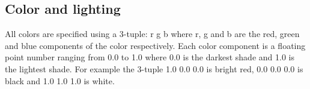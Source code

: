 \documentclass[11pt,twoside]{book}
\begin{document}




\subsection{Color and lighting}
All colors are specified using a 3-tuple: r g b
where r, g and b are the red, green and blue components of the color respectively.
Each color component is a floating point number ranging
from 0.0 to 1.0 where 0.0 is the darkest shade and 1.0 is the
lightest shade.  For example the 3-tuple 1.0 0.0 0.0 is bright red, 0.0 0.0 0.0 is black and
1.0 1.0 1.0 is white.


\end{document}
